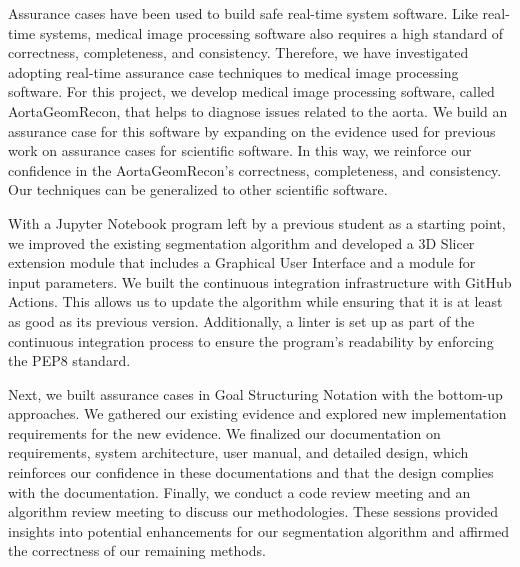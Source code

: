 
Assurance cases have been used to build safe real-time system software. Like real-time systems, medical image processing software also requires a high standard of correctness, completeness, and consistency. Therefore, we have investigated adopting real-time assurance case techniques to medical image processing software. For this project, we develop medical image processing software, called AortaGeomRecon, that helps to diagnose issues related to the aorta. We build an assurance case for this software by expanding on the evidence used for previous work on assurance cases for scientific software. In this way, we reinforce our confidence in the AortaGeomRecon's correctness, completeness, and consistency. Our techniques can be generalized to other scientific software.

With a Jupyter Notebook program left by a previous student as a starting point, we improved the existing segmentation algorithm and developed a 3D Slicer extension module that includes a Graphical User Interface and a module for input parameters. We built the continuous integration infrastructure with GitHub Actions. This allows us to update the algorithm while ensuring that it is at least as good as its previous version. Additionally, a linter is set up as part of the continuous integration process to ensure the program's readability by enforcing the PEP8 standard.

Next, we built assurance cases in Goal Structuring Notation with the bottom-up approaches. We gathered our existing evidence and explored new implementation requirements for the new evidence. We finalized our documentation on requirements, system architecture, user manual, and detailed design, which reinforces our confidence in these documentations and that the design complies with the documentation. Finally, we conduct a code review meeting and an algorithm review meeting to discuss our methodologies. These sessions provided insights into potential enhancements for our segmentation algorithm and affirmed the correctness of our remaining methods.